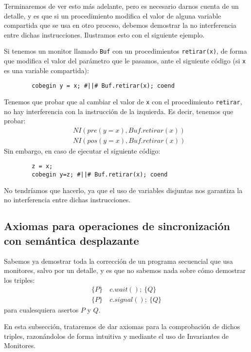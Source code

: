 Terminaremos de ver esto más adelante, pero es necesario darnos cuenta de un detalle, y es que si un procedimiento modifica el valor de alguna variable compartida que se usa en otro proceso, debemos demostrar la no interferencia entre dichas instrucciones. Ilustramos esto con el siguiente ejemplo.
\begin{ejemplo}
    Si tenemos un monitor llamado \verb|Buf| con un procedimientos \verb|retirar(x)|, de forma que modifica el valor del parámetro que le pasamos, ante el siguiente código (si \verb|x| es una variable compartida):
    \begin{verbatim}
        cobegin y = x; #||# Buf.retirar(x); coend
    \end{verbatim}
    Tenemos que probar que al cambiar el valor de \verb|x| con el procedimiento \verb|retirar|, no hay interferencia con la instrucción de la izquierda. Es decir, tenemos que probar:
    \begin{align*}
        &NI(pre(y=x), Buf.retirar(x)) \\
        &NI(pos(y=x), Buf.retirar(x))
    \end{align*}
    Sin embargo, en caso de ejecutar el siguiente código:
    \begin{verbatim}
        z = x;
        cobegin y=z; #||# Buf.retirar(x); coend
    \end{verbatim}
    No tendríamos que hacerlo, ya que el uso de variables disjuntas nos garantiza la no interferencia entre dichas instrucciones.
\end{ejemplo}

\subsection{Axiomas para operaciones de sincronización con semántica desplazante}
Sabemos ya demostrar toda la corrección de un programa secuencial que usa monitores, salvo por un detalle, y es que no sabemos nada sobre cómo demostrar los triples:
\begin{align*}
    \{P\}\ &c.wait();\ \{Q\} \\
    \{P\}\ &c.signal();\ \{Q\}
\end{align*}
para cualesquiera asertos $P$ y $Q$.

En esta subsección, trataremos de dar axiomas para la comprobación de dichos triples, razonándolos de forma intuitiva y mediante el uso de Invariantes de Monitores.\\

